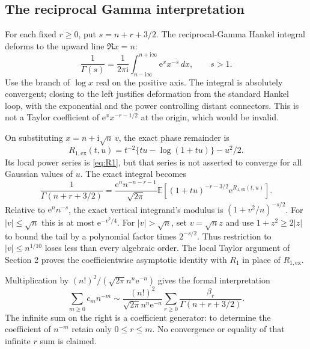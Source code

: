 \documentclass[11pt,letterpaper]{article}
\numberwithin{equation}{section}
\theoremstyle{remark}\newtheorem{remark}[theorem]{Remark}
\newcommand{\E}{\mathbb E}
\newcommand{\e}{\mathrm e}
\newcommand{\ii}{\mathrm i}
\begin{document}
\subsection{The reciprocal Gamma interpretation}
For each fixed $r\ge0$, put $s=n+r+3/2$. The reciprocal-Gamma Hankel integral \cite{dlmfgamma} deforms to the upward line $\Re x=n$:
\begin{equation}\label{eq:hankel}
 \frac1{\Gamma(s)}=\frac1{2\pi\ii}
 \int_{n-\ii\infty}^{n+\ii\infty}\e^x x^{-s}\,dx,\qquad s>1.
\end{equation}
Use the branch of $\log x$ real on the positive axis. The integral is absolutely convergent; closing to the left justifies deformation from the standard Hankel loop, with the exponential and the power controlling distant connectors. This is not a Taylor coefficient of $\e^x x^{-r-1/2}$ at the origin, which would be invalid.

On substituting $x=n+\ii\sqrt n\,v$, the exact phase remainder is
\begin{equation}\label{eq:Rexact}
 R_{1,\mathrm{ex}}(t,u)
 =t^{-2}\{tu-\log(1+tu)\}-u^2/2.
\end{equation}
Its local power series is \eqref{eq:R1}, but that series is not asserted to converge for all Gaussian values of $u$. The exact integral becomes
\begin{equation}\label{eq:gammaexact}
 \frac1{\Gamma(n+r+3/2)}=\frac{\e^n n^{-n-r-1}}{\sqrt{2\pi}}
 \E\left[(1+tu)^{-r-3/2}\e^{R_{1,\mathrm{ex}}(t,u)}\right].
\end{equation}
Relative to $\e^n n^{-s}$, the exact vertical integrand's modulus is
$(1+v^2/n)^{-s/2}$. For $|v|\le\sqrt n$ this is at most $\e^{-v^2/4}$. For $|v|>\sqrt n$, set $v=\sqrt n z$ and use $1+z^2\ge2|z|$ to bound the tail by a polynomial factor times $2^{-s/2}$. Thus restriction to $|v|\le n^{1/10}$ loses less than every algebraic order. The local Taylor argument of Section 2 proves the coefficientwise asymptotic identity with $R_1$ in place of $R_{1,\mathrm{ex}}$.

Multiplication by $(n!)^2/(\sqrt{2\pi}n^n\e^{-n})$ gives the formal interpretation
\begin{equation}\label{eq:gammagenerator}
 \sum_{m\ge0}c_m n^{-m}\sim
 \frac{(n!)^2}{\sqrt{2\pi}n^n\e^{-n}}
 \sum_{r\ge0}\frac{\beta_r}{\Gamma(n+r+3/2)}.
\end{equation}
The infinite sum on the right is a coefficient generator: to determine the coefficient of $n^{-m}$ retain only $0\le r\le m$. No convergence or equality of that infinite $r$ sum is claimed.
\end{document}
